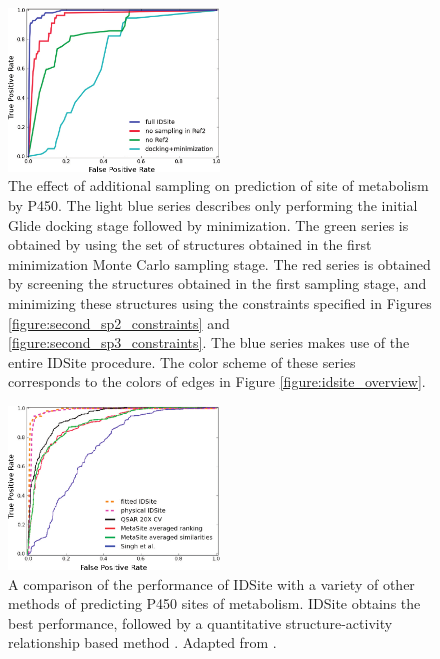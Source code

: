 \begin{figure}[h!]
\centering
\includegraphics[width=0.5\textwidth]{figures/idsite/roc_sampling.png}
\caption{The effect of additional sampling on prediction of site of metabolism by P450.
The light blue series describes only performing the initial Glide docking stage followed by minimization.
The green series is obtained by using the set of structures obtained in the first minimization Monte Carlo sampling stage.
The red series is obtained by screening the structures obtained in the first sampling stage, and minimizing these structures using the constraints specified in Figures \ref{figure:second_sp2_constraints} and \ref{figure:second_sp3_constraints}.
The blue series makes use of the entire IDSite procedure.
The color scheme of these series corresponds to the colors of edges in Figure \ref{figure:idsite_overview}.}
\label{figure:idsite_roc_sampling}
\end{figure}

\begin{figure}[h!]
\centering
\includegraphics[width=0.5\textwidth]{figures/idsite/roc_other_methods.png}
\caption{A comparison of the performance of IDSite with a variety of other methods of predicting P450 sites of metabolism.
IDSite obtains the best performance, followed by a quantitative structure-activity relationship based method \protect\cite{sheridan2007empirical}.
Adapted from \protect\cite{sheridan2007empirical}.
}
\label{figure:idsite_other}
\end{figure}

